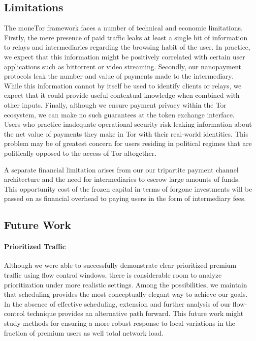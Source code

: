 \subsection{Limitations}
\label{subsec:limitations}

The moneTor framework faces a number of technical and economic
limitations. Firstly, the mere presence of paid traffic leaks at least a single
bit of information to relays and intermediaries regarding the browsing habit of
the user. In practice, we expect that this information might be positively
correlated with certain user applications such as bittorrent or video
streaming. Secondly, our nanopayment protocols leak the number and value of
payments made to the intermediary. While this information cannot by itself be
used to identify clients or relays, we expect that it could provide useful
contextual knowledge when combined with other inputs. Finally, although we
ensure payment privacy within the Tor ecosystem, we can make no such guarantees
at the token exchange interface. Users who practice inadequate operational
security risk leaking information about the net value of payments they make in
Tor with their real-world identities. This problem may be of greatest concern for
users residing in political regimes that are politically opposed to the access
of Tor altogether.

A separate financial limitation arises from our our tripartite payment channel
architecture and the need for intermediaries to escrow large amounts of
funds. This opportunity cost of the frozen capital in terms of forgone
investments will be passed on as financial overhead to paying users in the form
of intermediary fees.

\subsection{Future Work}
\label{subsec:future_work}

\paragraph*{Prioritized Traffic} Although we were able to successfully demonstrate
clear prioritized premium traffic using flow control windows, there is
considerable room to analyze prioritization under more realistic settings. Among
the possibilities, we maintain that scheduling provides the most conceptually
elegant way to achieve our goals. In the absence of effective scheduling,
extension and further analysis of our flow-control technique provides an
alternative path forward. This future work might study methods for ensuring a
more robust response to local variations in the fraction of premium users as
well total network load.

